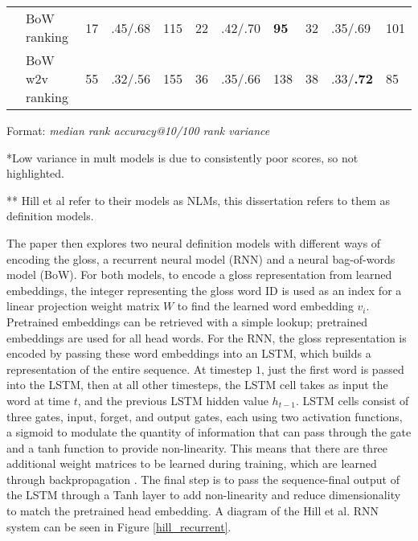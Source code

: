 \documentclass[11pt]{article}
\begin{document}
\begin{spacing}{1}
\begin{table}[!htbp]
\begin{tabular}{ P{1cm} p{3cm} | p{0.5cm} p{1cm} p{0.5cm} | p{0.5cm} p{1.2cm} p{0.5cm} |  p{0.5cm} p{1cm} p{0.5cm} }
                               & BoW ranking     & 17         & .45/.68          & 115         & 22          & .42/.70           & \textbf{95} & 32            & .35/.69         & 101           \\
                               & BoW w2v ranking & 55         & .32/.56          & 155         & 36          & .35/.66           & 138         & 38            & .33/\textbf{.72}         & 85            \\             
\end{tabular}
Format: \textit{median rank \hspace{0.4cm} accuracy@10/100 \hspace{0.4cm} rank variance} 

*Low variance in mult models is due to consistently poor scores, so not highlighted.

** Hill et al \citeyear{hill2015learning} refer to their models as NLMs, this dissertation refers to them as definition models. 
\label{hill_results_1}
\end{table}

The paper then explores two neural definition models with different ways of encoding the gloss, a recurrent neural model (RNN) and a neural bag-of-words model (BoW). For both models, to encode a gloss representation from learned embeddings, the integer representing the gloss word ID is used as an index for a linear projection weight matrix $W$ to find the learned word embedding $v_i$. Pretrained embeddings can be retrieved with a simple lookup; pretrained embeddings are used for all head words. For the RNN, the gloss representation is encoded by passing these word embeddings into an LSTM, which builds a representation of the entire sequence. At timestep $1$, just the first word is passed into the LSTM, then at all other timesteps, the LSTM cell takes as input the word at time $t$, and the previous LSTM hidden value \textit{$h_{t-1}$}. LSTM cells consist of three gates, input, forget, and output gates, each using two activation functions, a sigmoid to modulate the quantity of information that can pass through the gate and a tanh function to provide non-linearity. This means that there are three additional weight matrices to be learned during training, which are learned through backpropagation \cite[p.42]{DBLP:journals/corr/abs-1709-07809}. The final step is to pass the sequence-final output of the LSTM through a Tanh layer to add non-linearity and reduce dimensionality to match the pretrained head embedding. A diagram of the Hill et al. \citeyear{hill2015learning} RNN system can be seen in Figure \ref{hill_recurrent}.


\end{spacing}
\end{document}
